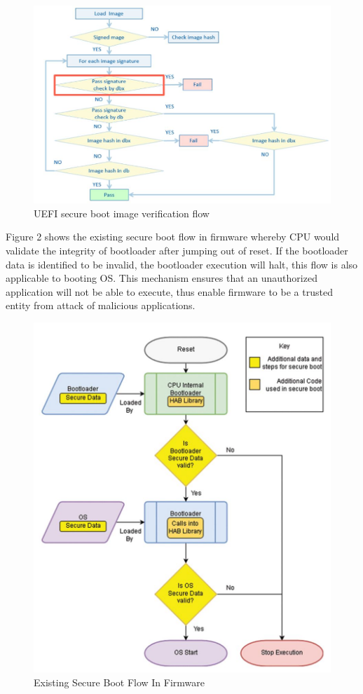 \documentclass[review]{elsarticle}
\begin{document}
\begin{figure}[H]
	\centering
	\includegraphics[width=1\textwidth]{figs/UefiSecureBootImageVerificationFlow.JPG}
	\caption{UEFI secure boot image verification flow \cite{R5:13}}
\end{figure}

Figure 2 shows the existing secure boot flow in firmware whereby CPU would validate the integrity of bootloader after jumping out of reset. If the bootloader data is identified to be invalid, the bootloader execution will halt, this flow is also applicable to booting OS. This mechanism ensures that an unauthorized application will not be able to execute, thus enable firmware to be a trusted entity from attack of malicious applications. 

\begin{figure}[H]
	\centering
	\includegraphics[width=1\textwidth]{figs/ExistingSecureBootFlowInFirmware.JPG}
	\caption{Existing Secure Boot Flow In Firmware \cite{R5:15}}
\end{figure}
\end{document}
